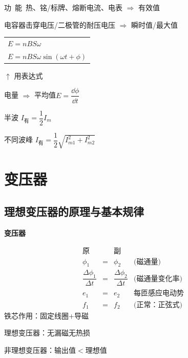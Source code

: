 \medskip
\noindent 功\ 能\ 热、铭/标牌、熔断电流、电表 $\Rightarrow$ 有效值

\noindent 电容器击穿电压/二极管的耐压电压 $\Rightarrow$ 瞬时值/最大值\quad
\begin{tabular}[c]{@{}l@{}}$E=nBS\omega$\\ $E=nBS\omega\sin(\omega t+\phi)$\end{tabular}

\hspace*{9em}$\uparrow$ 用表达式%

\medskip
\noindent 电量 $\Rightarrow$ 平均值\quad $E=\dfrac{\dd\phi}{\dd t}$%

半波 $I_{\text{有}}=\dfrac{1}{2}I_m$



不同波峰 $I_{\text{有}}=\dfrac{1}{2}\sqrt{I_{m1}^{2}+I_{m2}^{2}}$



\section{变压器}
\subsection{理想变压器的原理与基本规律}
\textbf{变压器}

\[
\begin{array}{lcll}
\text{原} & & \text{副} & \\[2pt]
\phi_1 & = & \phi_2 & \text{(磁通量)}\\[6pt]
\dfrac{\Delta\phi_1}{\Delta t} & = & \dfrac{\Delta\phi_2}{\Delta t} & \text{(磁通量变化率)}\\[10pt]
e_1 & = & e_2 & \text{每匝感应电动势}\\[6pt]
f_1 & = & f_2 & \text{(正常：正弦式)}
\end{array}
\]
铁芯作用：固定线圈+导磁

理想变压器：无漏磁无热损

非理想变压器：输出值$<$理想值

